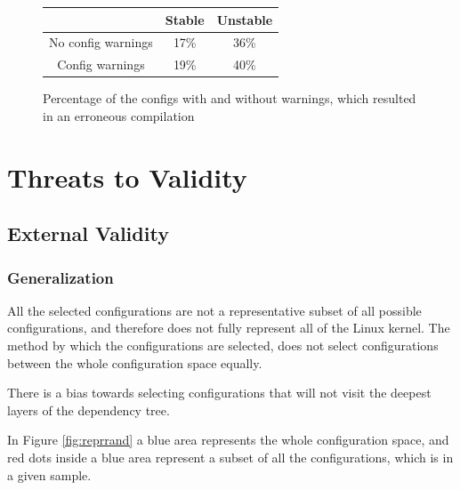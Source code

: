 \documentclass[a4paper,11pt]{report}
\newcommand{\figa}{
    \begin{figure}[!htpb]
    \centering
}
\newcommand{\figb}[2]{
    \caption{#1}
    \label{#2}
    \end{figure}
}
\begin{document}
\figa
    \begin{tabular}{c|c|c}
    \hline
    \hline
        & \textbf{Stable} & \textbf{Unstable} \\
    \hline
    No config warnings & 17\% & 36\%\\
    Config warnings & 19\% & 40\%\\
    \hline
    \hline
    \end{tabular}
\figb{Percentage of the configs with and without warnings, which resulted in an 
    erroneous compilation}{tbl:confwarns}

\fi %

            \newpage
            \chapter{Threats to Validity}
            \label{ch:ttv}


            \section{External Validity}
            \label{sec:extval}

            \subsection{Generalization}
            \label{sec:consel}

All the selected configurations are not a representative subset of all possible
configurations, and therefore does not fully represent all of the Linux kernel. 
The method by which the configurations are selected, does not select 
configurations between the whole configuration space equally.

There is a bias towards selecting configurations that will not visit the 
deepest layers of the dependency tree.

In Figure \ref{fig:reprrand} a blue area represents the whole configuration 
space, and red dots inside a blue area represent a subset of all the 
configurations, which is in a given sample.
\\
\end{document}
